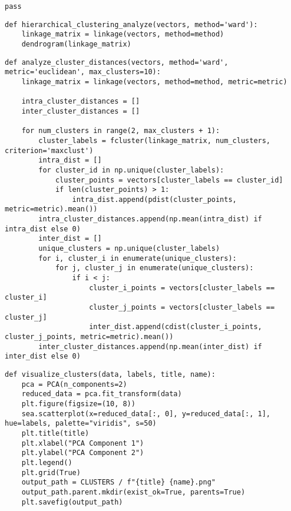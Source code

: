 \begin{lstlisting}[caption={Внутрикластерное и межкластерное расстояние для cmeans}]
    pass
\end{lstlisting}

\begin{lstlisting}[caption={Дендрограмма иерархической кластеризации}]
    def hierarchical_clustering_analyze(vectors, method='ward'):
    linkage_matrix = linkage(vectors, method=method)
    dendrogram(linkage_matrix)
\end{lstlisting}

\begin{lstlisting}[caption={Внутрикластерное и межкластерное расстояние для иерархической класетризации}]
    def analyze_cluster_distances(vectors, method='ward', metric='euclidean', max_clusters=10):
    linkage_matrix = linkage(vectors, method=method, metric=metric)

    intra_cluster_distances = []
    inter_cluster_distances = []

    for num_clusters in range(2, max_clusters + 1):
        cluster_labels = fcluster(linkage_matrix, num_clusters, criterion='maxclust')
        intra_dist = []
        for cluster_id in np.unique(cluster_labels):
            cluster_points = vectors[cluster_labels == cluster_id]
            if len(cluster_points) > 1: 
                intra_dist.append(pdist(cluster_points, metric=metric).mean())
        intra_cluster_distances.append(np.mean(intra_dist) if intra_dist else 0)
        inter_dist = []
        unique_clusters = np.unique(cluster_labels)
        for i, cluster_i in enumerate(unique_clusters):
            for j, cluster_j in enumerate(unique_clusters):
                if i < j: 
                    cluster_i_points = vectors[cluster_labels == cluster_i]
                    cluster_j_points = vectors[cluster_labels == cluster_j]
                    inter_dist.append(cdist(cluster_i_points, cluster_j_points, metric=metric).mean())
        inter_cluster_distances.append(np.mean(inter_dist) if inter_dist else 0)
\end{lstlisting}

\begin{lstlisting}[caption={Визуализация кластеров}]
    def visualize_clusters(data, labels, title, name):
    pca = PCA(n_components=2)
    reduced_data = pca.fit_transform(data)
    plt.figure(figsize=(10, 8))
    sea.scatterplot(x=reduced_data[:, 0], y=reduced_data[:, 1], hue=labels, palette="viridis", s=50)
    plt.title(title)
    plt.xlabel("PCA Component 1")
    plt.ylabel("PCA Component 2")
    plt.legend()
    plt.grid(True)
    output_path = CLUSTERS / f"{title} {name}.png"
    output_path.parent.mkdir(exist_ok=True, parents=True)
    plt.savefig(output_path)
\end{lstlisting}

